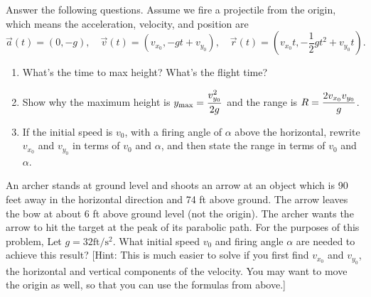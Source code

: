 \begin{problem}%
 Answer the following questions. Assume we fire a projectile from the origin, which means the acceleration, velocity, and position are 
$$ \vec a(t) = (0,-g),\quad 
\vec v(t) = (v_{x_0}, -gt+ v_{y_0}),\quad
\vec r(t) = (v_{x_0}t, -\frac12 gt^2+ v_{y_0}t)
.$$
\begin{enumerate}
 \item What's the time to max height?  What's the flight time? 
 \item Show why the maximum height is $\displaystyle y_{\max}=\frac{v_{y_0}^2}{2g}$ and the range is $\displaystyle R=\frac{2v_{x_0}v_{y_0}}{g}$.
 \item If the initial speed is $v_0$, with a firing angle of $\alpha$ above the horizontal, rewrite $v_{x_0}$ and $v_{y_0}$ in terms of $v_0$ and $\alpha$, and then state the range in terms of $v_0$ and $\alpha$. 
\end{enumerate}
\end{problem}

\begin{problem}
%

 An archer stands at ground level and shoots an arrow at an object which is 90 feet away in the horizontal direction and 74 ft above ground. The arrow leaves the bow at about 6 ft above ground level (not the origin). 
 The archer wants the arrow to hit the target at the peak of its parabolic path. 
 For the purposes of this problem, Let $g = 32 \text{ft}/\text{s}^2$. 
 What initial speed $v_0$ and firing angle $\alpha$ are needed to achieve this result? 
 [Hint: This is much easier to solve if you first find $v_{x_0}$ and $v_{y_0}$, the horizontal and vertical components of the velocity. You may want to move the origin as well, so that you can use the formulas from above.]
\end{problem}

